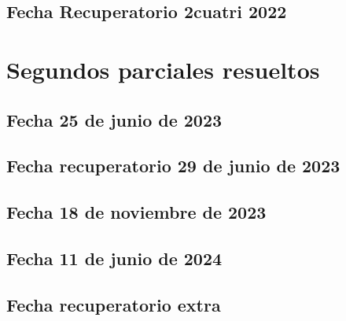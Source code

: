 \documentclass[10pt, a4paper]{report}
\begin{document}
        \newpage
        \section{Fecha Recuperatorio 2cuatri 2022}
            



        \newpage
    \chapter{Segundos parciales resueltos}
        \section{Fecha 25 de junio de 2023}
            



        \newpage
        \section{Fecha recuperatorio 29 de junio de 2023}
            



        \newpage
        \section{Fecha 18 de noviembre de 2023}
            



        \newpage
        \section{Fecha 11 de junio de 2024}
            
     
    
          
           
            
          
                  \newpage
        \section{Fecha recuperatorio extra}
            
    
 
\end{document}
